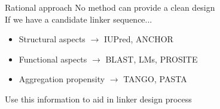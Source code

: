 \documentclass{beamer}
\begin{document}
\begin{frame}{Rational approach}
No method can provide a clean design\\ %
\vspace{5px}
\pause
If we have a candidate linker sequence...
\pause
\begin{itemize}
\item Structural aspects $\rightarrow$ IUPred, ANCHOR \pause
\item Functional aspects $\rightarrow$ BLAST, LMs, PROSITE  \pause
\item Aggregation propensity $\rightarrow$ TANGO, PASTA  
\end{itemize}




\vspace{10px}
\pause 
\Large{Use this information to aid in linker design process}



% 
% 
\end{frame}
\end{document}

